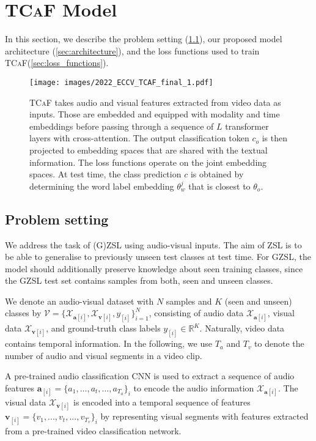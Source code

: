 \documentclass[runningheads]{llncs}
\newcommand{\modelName}{\textsc{TCaF}\xspace}
\begin{document}
\section{\modelName Model}
In this section, we describe the problem setting (\cref{sec:problem_setting}), our proposed model architecture (\cref{sec:architecture}), and the loss functions used to train \modelName (\cref{sec:loss_functions}).


\begin{figure}[t]
    \centering
    \texttt{[image: images/2022\_ECCV\_TCAF\_final\_1.pdf]}
    \caption{\modelName takes audio and visual features extracted from video data as inputs. Those are embedded and equipped with modality and time embeddings before passing through a sequence of $L$ transformer layers with cross-attention. The output classification token $c_o$ is then projected to embedding spaces that are shared with the textual information. The loss functions operate on the joint embedding spaces. At test time, the class prediction $c$ is obtained by determining the word label embedding $\theta_w^j$ that is closest to $\theta_o$.
    }
    \label{fig:architecture}
\end{figure}


\subsection{Problem setting}\label{sec:problem_setting}
We address the task of (G)ZSL using audio-visual inputs. The aim of ZSL is to be able to generalise to previously unseen test classes at test time. For GZSL, the model should additionally preserve knowledge about seen training classes, since the GZSL test set contains samples from both, seen and unseen classes.

We denote an audio-visual dataset with $N$ samples and $K$ (seen and unseen) classes by $\mathcal{V} = \{\mathcal{X}_{\bm{a}[i]}, \mathcal{X}_{\bm{v}[i]}, y_{[i]}\}_{i=1}^{N}$, consisting of audio data $\mathcal{X}_{\bm{a}[i]}$, visual data $\mathcal{X}_{\bm{v}[i]}$, and ground-truth class labels $y_{[i]} \in \mathbb{R}^{{K}}$. Naturally, video data contains temporal information. In the following, we use $T_a$ and $T_v$ to denote the number of audio and visual segments in a video clip.

A pre-trained audio classification CNN is used to extract a sequence of audio features $\bm{a}_{[i]} = \{a_{1}, \dots, a_{t}, \dots, a_{T_a}\}_i$ to encode the audio information $\mathcal{X}_{\bm{a}[i]}$.
The visual data $\mathcal{X}_{\bm{v}[i]}$ is encoded into a temporal sequence of features $\bm{v}_{[i]} = \{v_{1}, ..., v_{t}, ..., v_{T_v}\}_i$ by representing visual segments with features extracted from a pre-trained video classification network.
\end{document}
